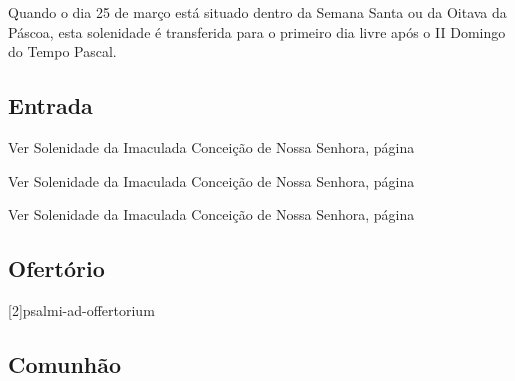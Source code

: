 
\begin{rubrica}
  Quando o dia 25 de março está situado dentro da Semana Santa ou da Oitava da Páscoa, esta solenidade é transferida para o primeiro dia livre após o II Domingo do Tempo Pascal.
\end{rubrica}

\subsection{Entrada}\label{subsection:proprium-sanctorum/in-annuntiatione-domini/introitus}

\begin{rubrica}
  Ver Solenidade da Imaculada Conceição de Nossa Senhora, página~\pageref{subsection:proprium-sanctorum/in-conceptione-immaculata-bmv/psalmus-responsorius}
\end{rubrica}

\begin{rubrica}
  Ver Solenidade da Imaculada Conceição de Nossa Senhora, página~\pageref{subsection:proprium-sanctorum/in-conceptione-immaculata-bmv/alleluia}
\end{rubrica}

\begin{rubrica}
  Ver Solenidade da Imaculada Conceição de Nossa Senhora, página~\pageref{subsection:proprium-sanctorum/in-conceptione-immaculata-bmv/psalmus-alleluiaticus}
\end{rubrica}

\AllowPageFlush

\subsection{Ofertório}\label{subsection:proprium-sanctorum/in-annuntiatione-domini/offertorium}
[2]{psalmi-ad-offertorium}

\AllowPageBreak

\subsection{Comunhão}\label{subsection:proprium-sanctorum/in-annuntiatione-domini/communio}

\AllowPageFlush